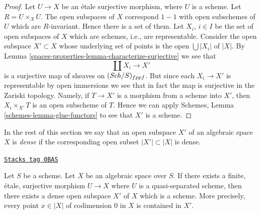 \begin{proof}
Let $U \to X$ be an \'etale surjective morphism, where $U$ is a scheme.
Let $R = U \times_X U$. The open subspaces of $X$ correspond $1 - 1$
with open subschemes of $U$ which are $R$-invariant. Hence there is a
set of them. Let $X_i$, $i \in I$ be the set of open subspaces
of $X$ which are schemes, i.e., are representable. Consider the
open subspace $X' \subset X$ whose underlying set of points is
the open $\bigcup |X_i|$ of $|X|$. By
Lemma \ref{spaces-properties-lemma-characterize-surjective}
we see that
$$
\coprod X_i \longrightarrow X'
$$
is a surjective map of sheaves on $(\mathit{Sch}/S)_{fppf}$.
But since each $X_i \to X'$ is representable by open immersions
we see that in fact the map is surjective in the Zariski
topology. Namely, if $T \to X'$ is a morphism from a scheme
into $X'$, then $X_i \times_{X'} T$ is an open subscheme of $T$.
Hence we can apply
Schemes, Lemma \ref{schemes-lemma-glue-functors}
to see that $X'$ is a scheme.
\end{proof}

In the rest of this section we say that an open subspace
$X'$ of an algebraic space $X$ is {\it dense} if the corresponding
open subset $|X'| \subset |X|$ is dense.

\begin{lemma}
\label{spaces-properties-lemma-quasi-separated-finite-etale-cover-dense-open-scheme}
\href{https://stacks.math.columbia.edu/tag/0BAS}{\texttt{Stacks tag 0BAS}}

Let $S$ be a scheme. Let $X$ be an algebraic space over $S$.
If there exists a finite, \'etale, surjective morphism
$U \to X$ where $U$ is a quasi-separated scheme, then
there exists a dense open subspace $X'$ of $X$ which is a scheme.
More precisely, every point $x \in |X|$ of codimension $0$ in $X$
is contained in $X'$.
\end{lemma}

